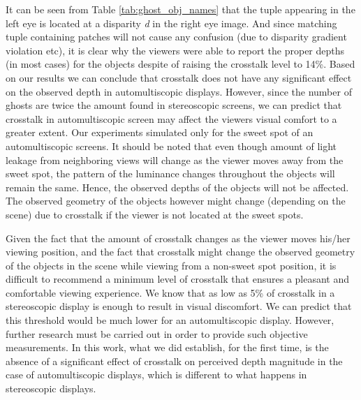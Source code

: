 It can be seen from Table \ref{tab:ghost_obj_names} that the tuple appearing in the left eye is located at a disparity \emph{d} in the right eye image. And since matching tuple containing patches will not cause any confusion (due to disparity gradient violation etc), it is clear why the viewers were able to report the proper depths (in most cases) for the objects despite of raising the crosstalk level to 14\%. Based on our results we can conclude that crosstalk does not have any significant effect on the observed depth in automultiscopic displays. However, since the number of ghosts are twice the amount found in stereoscopic screens, we can predict that crosstalk in automultiscopic screen may affect the viewers visual comfort to a greater extent. Our experiments simulated only for the sweet spot of an automultiscopic screens. It should be noted that even though amount of light leakage from neighboring views will change as the viewer moves away from the sweet spot, the pattern of the luminance changes throughout the objects will remain the same. Hence, the observed depths of the objects will not be affected. The observed geometry of the objects however might change (depending on the scene) due to crosstalk if the viewer is not located at the sweet spots.

Given the fact that the amount of crosstalk changes as the viewer moves his/her viewing position, and the fact that crosstalk might change the observed geometry of the objects in the scene while viewing from a non-sweet spot position, it is difficult to recommend a minimum level of crosstalk that ensures a pleasant and comfortable viewing experience. We know that as low as 5\% of crosstalk in a stereoscopic display is enough to result in visual discomfort. We can predict that this threshold would be much lower for an automultiscopic display. However, further research must be carried out in order to provide such objective measurements. In this work, what we did establish, for the first time, is the absence of a significant effect of crosstalk on perceived depth magnitude in the case of automultiscopic displays, which is different to what happens in stereoscopic displays.

